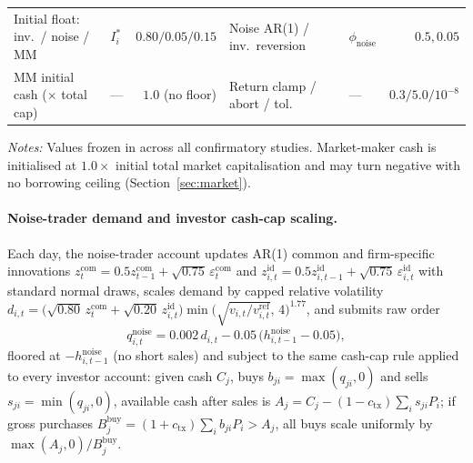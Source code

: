 \documentclass[11pt]{article}
\begin{document}
\begin{table}[h]
\begin{threeparttable}
\begin{tabular}{@{}llr|llr@{}}
Initial float: inv.\ / noise / MM & $I^*_i$ & $0.80 / 0.05 / 0.15$ & Noise AR(1) / inv.\ reversion & $\phi_{\mathrm{noise}}$ & $0.5, 0.05$ \\
MM initial cash ($\times$ total cap) & --- & $1.0$ (no floor) & Return clamp / abort / tol. & --- & $0.3 / 5.0 / 10^{-8}$ \\
\bottomrule
\end{tabular}
\begin{tablenotes}[flushleft]\footnotesize
\item \textit{Notes:} Values frozen in  across all confirmatory studies. Market-maker cash is initialised at $1.0\times$ initial total market capitalisation and may turn negative with no borrowing ceiling (Section~\ref{sec:market}).
\end{tablenotes}
\end{threeparttable}
\end{table}

\paragraph{Noise-trader demand and investor cash-cap scaling.}
Each day, the noise-trader account updates AR(1) common and firm-specific innovations $z_t^{\mathrm{com}} = 0.5 z_{t-1}^{\mathrm{com}} + \sqrt{0.75}\,\varepsilon_t^{\mathrm{com}}$ and $z_{i,t}^{\mathrm{id}} = 0.5 z_{i,t-1}^{\mathrm{id}} + \sqrt{0.75}\,\varepsilon_{i,t}^{\mathrm{id}}$ with standard normal draws, scales demand by capped relative volatility $d_{i,t} = \big(\sqrt{0.80}\,z_t^{\mathrm{com}} + \sqrt{0.20}\,z_{i,t}^{\mathrm{id}}\big)\min\!\big(\sqrt{v_{i,t}/v_{i,t}^{\mathrm{ref}}},\,4\big)^{1.77}$, and submits raw order
\[
q_{i,t}^{\mathrm{noise}} = 0.002\,d_{i,t} - 0.05\,\big(h_{i,t-1}^{\mathrm{noise}} - 0.05\big),
\]
floored at $-h_{i,t-1}^{\mathrm{noise}}$ (no short sales) and subject to the same cash-cap rule applied to every investor account: given cash $C_j$, buys $b_{ji} = \max(q_{ji}, 0)$ and sells $s_{ji} = \min(q_{ji}, 0)$, available cash after sales is $A_j = C_j - (1 - c_{\mathrm{tx}})\sum_i s_{ji} P_i$; if gross purchases $B_j^{\mathrm{buy}} = (1 + c_{\mathrm{tx}})\sum_i b_{ji} P_i > A_j$, all buys scale uniformly by $\max(A_j, 0)/B_j^{\mathrm{buy}}$.
\end{document}
